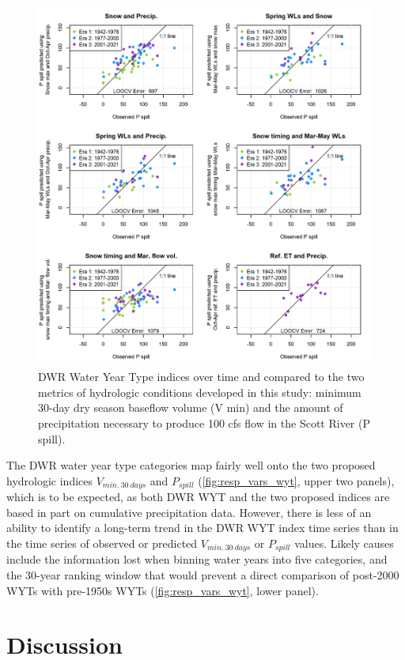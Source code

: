 \documentclass[hess, manuscript]{copernicus}
\begin{document}
\begin{figure}
\includegraphics[width=1\linewidth]{f15} \caption{\label{fig:resp_vars_wyt} DWR Water Year Type indices over time and compared to the two metrics of hydrologic conditions developed in this study: minimum 30-day dry season baseflow volume (V min) and the amount of precipitation necessary to produce 100 cfs flow in the Scott River (P spill).}\label{fig:resp_vars_wyt}
\end{figure}

The DWR water year type categories map fairly well onto the two proposed
hydrologic indices \(V_{min.~30~days}\) and \(P_{spill}\)
(\autoref{fig:resp_vars_wyt}, upper two panels), which is to be
expected, as both DWR WYT and the two proposed indices are based in part
on cumulative precipitation data. However, there is less of an ability
to identify a long-term trend in the DWR WYT index time series than in
the time series of observed or predicted \(V_{min.~30~days}\) or
\(P_{spill}\) values. Likely causes include the information lost when
binning water years into five categories, and the 30-year ranking window
that would prevent a direct comparison of post-2000 WYTs with pre-1950s
WYTs (\autoref{fig:resp_vars_wyt}, lower panel).

\section{Discussion}
\end{document}

